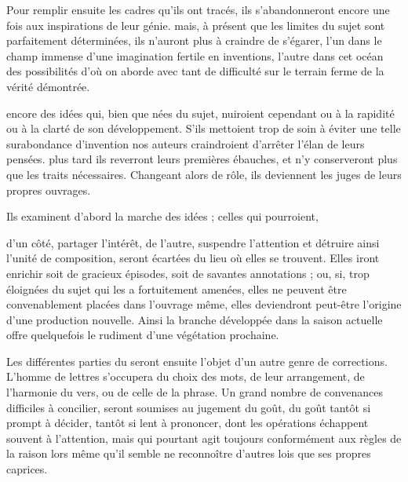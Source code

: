 \documentclass[11pt,a4paper]{article}
\begin{document}
Pour remplir ensuite les cadres qu'ils ont tracés, ils s'abandonneront encore
une fois aux inspirations de leur génie. mais, à présent que les limites du
sujet sont parfaitement déterminées, ils n'auront plus à craindre de s'égarer,
l'un dans le champ immense d'une imagination fertile en inventions, l'autre
dans  cet océan des possibilités d'où on aborde avec tant de
difficulté sur le terrain ferme de la vérité démontrée.

  encore des idées  qui, bien que nées
du sujet, nuiroient cependant ou à la rapidité ou à la clarté de son
développement. S'ils mettoient trop de soin à éviter une telle surabondance
d'invention nos auteurs craindroient d'arrêter l'élan de leurs pensées. plus
tard ils reverront leurs premières ébauches, et n'y conserveront plus que les
 traits nécessaires. Changeant alors de rôle, ils deviennent les
juges de leurs propres ouvrages.


Ils examinent d'abord la marche des idées ; celles qui pourroient,


d'un côté, partager l'intérêt, de l'autre, suspendre l'attention et détruire
ainsi l'unité de composition, seront écartées du lieu où elles se trouvent.
Elles iront enrichir soit de gracieux épisodes, soit de savantes annotations ;
ou, si, trop éloignées du sujet qui les a fortuitement amenées, elles ne
peuvent être convenablement placées dans l'ouvrage même, elles deviendront
peut-être l'origine d'une production nouvelle. Ainsi la branche développée
dans la saison actuelle offre quelquefois le rudiment d'une végétation
prochaine.

Les différentes parties du  seront ensuite l'objet d'un autre
genre de corrections. L'homme de lettres s'occupera du choix des mots, de leur
arrangement, de l'harmonie du vers, ou de celle de la phrase. Un grand nombre de
convenances difficiles à concilier, seront soumises au jugement du goût, du goût
tantôt si prompt à décider, tantôt si lent à prononcer, dont les opérations
échappent souvent à l'attention, mais qui pourtant agit toujours conformément
aux règles de la raison lors même qu'il semble ne reconnoître d'autres lois que
ses propres caprices.
\end{document}
